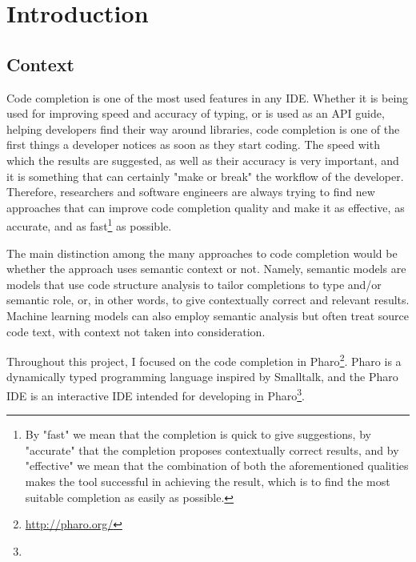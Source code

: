 \chapter{Introduction}
\label{chap:Introduction}

\section{Context}
\label{sec:Introduction-Context}
Code completion is one of the most used features in any IDE. Whether it is being used for improving speed and accuracy of typing, or is used as an API guide, helping developers find their way around libraries, code completion is one of the first things a developer notices as soon as they start coding. The speed with which the results are suggested, as well as their accuracy is very important, and it is something that can certainly "make or break" the workflow of the developer. Therefore, researchers and software engineers are always trying to find new approaches that can improve code completion quality and make it as effective, as accurate, and as fast\footnote{By "fast" we mean that the completion is quick to give suggestions, by "accurate" that the completion proposes contextually correct results, and by "effective" we mean that the combination of both the aforementioned qualities makes the tool successful in achieving the result, which is to find the most suitable completion as easily as possible.} as possible.

The main distinction among the many approaches to code completion would be whether the approach uses semantic context or not. Namely, semantic models are models that use code structure analysis to tailor completions to type and/or semantic role, or, in other words, to give contextually correct and relevant results. Machine learning models can also  employ semantic analysis but  often  treat source code  text, with context not taken into consideration.

Throughout this project, I focused on the code completion in Pharo\footnote{\url{http://pharo.org/}}. Pharo is a dynamically typed programming language inspired by Smalltalk, and the Pharo IDE is an interactive IDE intended for developing in Pharo\footnote{}.

